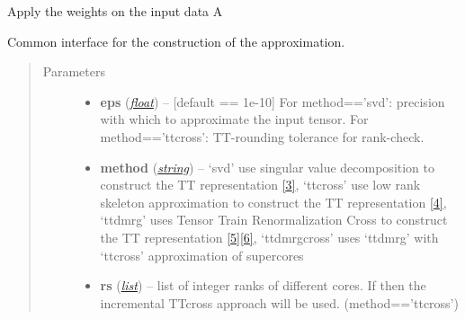 \documentclass[a4paper,10pt,english]{sphinxmanual}
\begin{document}
\begin{fulllineitems}
\begin{quote}
\begin{description}
\begin{itemize}
\end{itemize}

\end{description}\end{quote}

\begin{fulllineitems}
\label{api-wttvec:TensorToolbox.core.WTTvec.apply_weights_on_data}
Apply the weights on the input data A

\end{fulllineitems}


\begin{fulllineitems}
\label{api-wttvec:TensorToolbox.core.WTTvec.build}
Common interface for the construction of the approximation.
\begin{quote}\begin{description}
\item[{Parameters}] \leavevmode\begin{itemize}
\item {} 
\textbf{eps} (\href{http://docs.python.org/library/functions.html\#float}{\emph{float}}) -- {[}default == 1e-10{]} For method=='svd': precision with which to approximate the input tensor. For method=='ttcross': TT-rounding tolerance for rank-check.

\item {} 
\textbf{method} (\href{http://docs.python.org/library/string.html\#module-string}{\emph{string}}) -- `svd' use singular value decomposition to construct the TT representation {\hyperref[zrefs:oseledets2011]{{[}3{]}}}, `ttcross' use low rank skeleton approximation to construct the TT representation {\hyperref[zrefs:oseledets2010]{{[}4{]}}}, `ttdmrg' uses Tensor Train Renormalization Cross to construct the TT representation {\hyperref[zrefs:savostyanov2011]{{[}5{]}}}{\hyperref[zrefs:savostyanov2013]{{[}6{]}}}, `ttdmrgcross' uses `ttdmrg' with `ttcross' approximation of supercores

\item {} 
\textbf{rs} (\href{http://docs.python.org/library/functions.html\#list}{\emph{list}}) -- list of integer ranks of different cores. If  then the incremental TTcross approach will be used. (method=='ttcross')


\end{itemize}
\end{description}
\end{quote}
\end{fulllineitems}
\end{fulllineitems}
\end{document}
